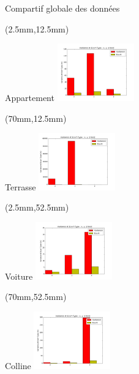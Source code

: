 \documentclass[10pt]{beamer}
\begin{document}
  \begin{frame}{Compartif globale des données}

    		\begin{textblock*}{60mm}(2.5mm,12.5mm)
	  		\begin{block}{Appartement}
				\includegraphics[width=125px]{../src/data/itinary_1/var_ecart.png}
			\end{block}
  		\end{textblock*}

  		 \begin{textblock*}{60mm}(70mm,12.5mm)
  		 	\begin{block}{Terrasse}
				\includegraphics[width=125px]{../src/data/itinary_2/var_ecart.png}
			\end{block}
  		\end{textblock*}

  		\begin{textblock*}{60mm}(2.5mm,52.5mm)
  		 	\begin{block}{Voiture}
				\includegraphics[width=125px]{../src/data/itinary_3/var_ecart.png}
			\end{block}
  		\end{textblock*}


		\begin{textblock*}{60mm}(70mm,52.5mm)
			\begin{block}{Colline}
				\includegraphics[width=125px]{../src/data/itinary_4/var_ecart.png}
			\end{block}
		\end{textblock*}
  \end{frame}
\end{document}
